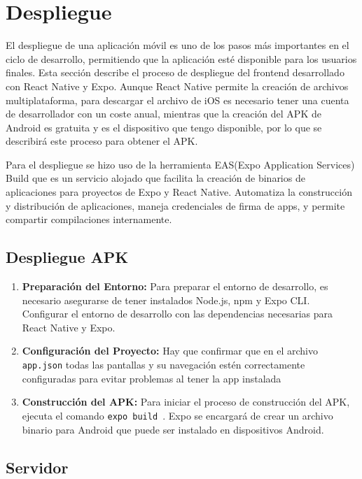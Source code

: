 \chapter{Despliegue}

El despliegue de una aplicación móvil es uno de los pasos más importantes en el ciclo de desarrollo, permitiendo que la aplicación esté disponible para los usuarios finales. Esta sección describe el proceso de despliegue del frontend desarrollado con React Native y Expo. Aunque React Native permite la creación de archivos multiplataforma, para descargar el archivo de iOS es necesario tener una cuenta de desarrollador con un coste anual, mientras que la creación del APK de Android es gratuita y es el dispositivo que tengo disponible, por lo que se describirá este proceso para obtener el APK.

Para el despliegue se hizo uso de la herramienta EAS(Expo Application Services) Build que es un servicio alojado que facilita la creación de binarios de aplicaciones para proyectos de Expo y React Native. Automatiza la construcción y distribución de aplicaciones, maneja credenciales de firma de apps, y permite compartir compilaciones internamente. \cite{easbuild}

\section{Despliegue APK}

\begin{enumerate}
    \item \textbf{Preparación del Entorno: } Para preparar el entorno de desarrollo, es necesario asegurarse de tener instalados Node.js, npm y Expo CLI. Configurar el entorno de desarrollo con las dependencias necesarias para React Native y Expo.
    \item \textbf{Configuración del Proyecto: } Hay que confirmar que en el archivo \texttt{app.json} todas las pantallas y su navegación estén correctamente configuradas para evitar problemas al tener la app instalada
    \item \textbf{Construcción del APK: } Para iniciar el proceso de construcción del APK, ejecuta el comando \texttt{expo build
          }. Expo se encargará de crear un archivo binario para Android que puede ser instalado en dispositivos Android.

\end{enumerate}

\section{Servidor}

